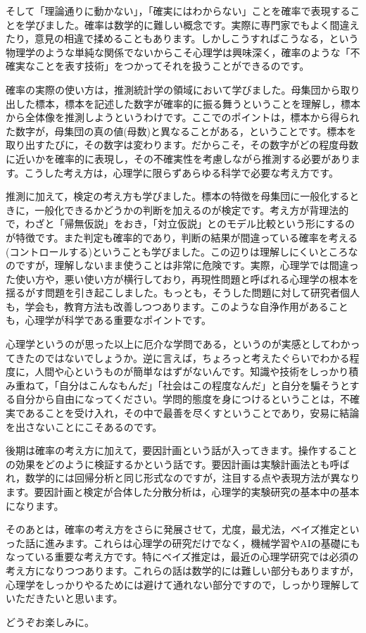 \documentclass{ltjbook}
\begin{document}
そして「理論通りに動かない」，「確実にはわからない」ことを確率で表現することを学びました。確率は数学的に難しい概念です。実際に専門家でもよく間違えたり，意見の相違で揉めることもあります。しかしこうすればこうなる，という物理学のような単純な関係でないからこそ心理学は興味深く，確率のような「不確実なことを表す技術」をつかってそれを扱うことができるのです。

確率の実際の使い方は，推測統計学の領域において学びました。母集団から取り出した標本，標本を記述した数字が確率的に振る舞うということを理解し，標本から全体像を推測しようというわけです。ここでのポイントは，標本から得られた数字が，母集団の真の値(母数)と異なることがある，ということです。標本を取り出すたびに，その数字は変わります。だからこそ，その数字がどの程度母数に近いかを確率的に表現し，その不確実性を考慮しながら推測する必要があります。こうした考え方は，心理学に限らずあらゆる科学で必要な考え方です。

推測に加えて，検定の考え方も学びました。標本の特徴を母集団に一般化するときに，一般化できるかどうかの判断を加えるのが検定です。考え方が背理法的で，わざと「帰無仮説」をおき，「対立仮説」とのモデル比較という形にするのが特徴です。また判定も確率的であり，判断の結果が間違っている確率を考える(コントロールする)ということも学びました。この辺りは理解しにくいところなのですが，理解しないまま使うことは非常に危険です。実際，心理学では間違った使い方や，悪い使い方が横行しており，再現性問題と呼ばれる心理学の根本を揺るがす問題を引き起こしました。もっとも，そうした問題に対して研究者個人も，学会も，教育方法も改善しつつあります。このような自浄作用があることも，心理学が科学である重要なポイントです。

心理学というのが思った以上に厄介な学問である，というのが実感としてわかってきたのではないでしょうか。逆に言えば，ちょろっと考えたぐらいでわかる程度に，人間や心というものが簡単なはずがないんです。知識や技術をしっかり積み重ねて，「自分はこんなもんだ」「社会はこの程度なんだ」と自分を騙そうとする自分から自由になってください。学問的態度を身につけるということは，不確実であることを受け入れ，その中で最善を尽くすということであり，安易に結論を出さないことにこそあるのです。


後期は確率の考え方に加えて，要因計画という話が入ってきます。操作することの効果をどのように検証するかという話です。要因計画は実験計画法とも呼ばれ，数学的には回帰分析と同じ形式なのですが，注目する点や表現方法が異なります。要因計画と検定が合体した分散分析は，心理学的実験研究の基本中の基本になります。

そのあとは，確率の考え方をさらに発展させて，尤度，最尤法，ベイズ推定といった話に進みます。これらは心理学の研究だけでなく，機械学習やAIの基礎にもなっている重要な考え方です。特にベイズ推定は，最近の心理学研究では必須の考え方になりつつあります。これらの話は数学的には難しい部分もありますが，心理学をしっかりやるためには避けて通れない部分ですので，しっかり理解していただきたいと思います。

どうぞお楽しみに。
\end{document}
